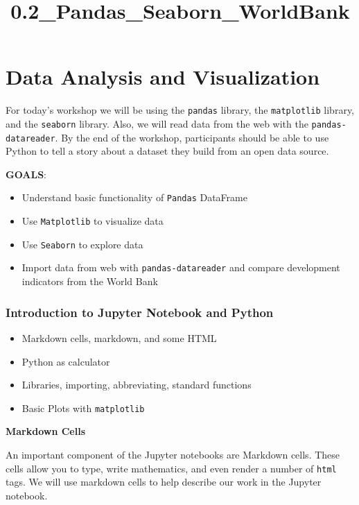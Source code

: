 \documentclass[11pt]{article}
\title{0.2\_Pandas\_Seaborn\_WorldBank}
\providecommand{\tightlist}{%
      \setlength{\itemsep}{0pt}\setlength{\parskip}{0pt}}
\begin{document}
    
    
    \maketitle
    
    

    
    \section{Data Analysis and
Visualization}\label{data-analysis-and-visualization}

For today's workshop we will be using the \texttt{pandas} library, the
\texttt{matplotlib} library, and the \texttt{seaborn} library. Also, we
will read data from the web with the \texttt{pandas-datareader}. By the
end of the workshop, participants should be able to use Python to tell a
story about a dataset they build from an open data source.

\textbf{GOALS}:

\begin{itemize}
\tightlist
\item
  Understand basic functionality of \texttt{Pandas} DataFrame
\item
  Use \texttt{Matplotlib} to visualize data
\item
  Use \texttt{Seaborn} to explore data
\item
  Import data from web with \texttt{pandas-datareader} and compare
  development indicators from the World Bank
\end{itemize}

    \subsubsection{Introduction to Jupyter Notebook and
Python}\label{introduction-to-jupyter-notebook-and-python}

\begin{itemize}
\tightlist
\item
  Markdown cells, markdown, and some HTML
\item
  Python as calculator
\item
  Libraries, importing, abbreviating, standard functions
\item
  Basic Plots with \texttt{matplotlib}
\end{itemize}

    \textbf{Markdown Cells}

An important component of the Jupyter notebooks are Markdown cells.
These cells allow you to type, write mathematics, and even render a
number of \texttt{html} tags. We will use markdown cells to help
describe our work in the Jupyter notebook.
\end{document}
